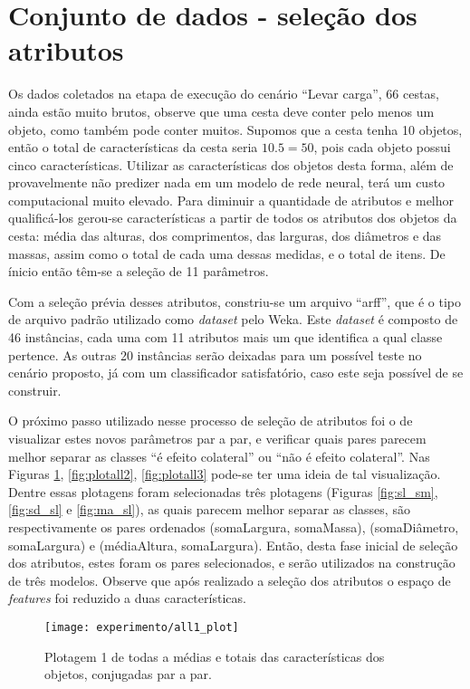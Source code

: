 \section{Conjunto de dados - seleção dos atributos}
\label{sec:construmrn}
Os dados coletados na etapa de execução do cenário ``Levar carga'', 66 cestas, ainda estão muito brutos, observe que uma cesta deve conter pelo menos um objeto, como também pode conter muitos. Supomos que a cesta tenha 10 objetos, então o total de características da cesta seria $10.5=50$, pois cada objeto possui cinco características. Utilizar as características dos objetos desta forma, além de provavelmente não predizer nada em um modelo de rede neural, terá um custo computacional muito elevado. Para diminuir a quantidade de atributos e melhor qualificá-los gerou-se características a partir de todos os atributos dos objetos da cesta: média das alturas, dos comprimentos, das larguras, dos diâmetros e das massas, assim como o total de cada uma dessas medidas, e o total de itens. De ínicio então têm-se a seleção de 11 parâmetros.

Com a seleção prévia desses atributos, constriu-se um arquivo ``arff'', que é o tipo de arquivo padrão utilizado como \textit{dataset} pelo Weka\cite{Hall:2009}. Este \textit{dataset} é composto de 46 instâncias, cada uma com 11 atributos mais um que identifica a qual classe pertence. As outras 20 instâncias serão deixadas para um possível teste no cenário proposto, já com um classificador satisfatório, caso este seja possível de se construir.

O próximo passo utilizado nesse processo de seleção de atributos foi o de visualizar estes novos parâmetros par a par, e verificar quais pares parecem melhor separar as classes ``é efeito colateral'' ou ``não é efeito colateral''. Nas Figuras \ref{fig:plotall1}, \ref{fig:plotall2}, \ref{fig:plotall3} pode-se ter uma ideia de tal visualização. Dentre essas plotagens foram selecionadas três plotagens (Figuras \ref{fig:sl_sm}, \ref{fig:sd_sl} e \ref{fig:ma_sl}), as quais parecem melhor separar as classes, são respectivamente os pares ordenados (somaLargura, somaMassa), (somaDiâmetro, somaLargura) e (médiaAltura, somaLargura). Então, desta fase inicial de seleção dos atributos, estes foram os pares selecionados, e serão utilizados na construção de três modelos. Observe que após realizado a seleção dos atributos o espaço de \textit{features} foi reduzido a duas características.

\begin{figure}[!htb] \centering 
  \centering
  \texttt{[image: experimento/all1\_plot]} 
  \caption{Plotagem 1 de todas a médias e totais das características dos objetos, conjugadas par a par.} 
  \label{fig:plotall1}
\end{figure}


